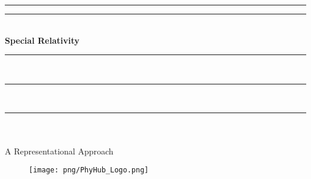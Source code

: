 \rule{\textwidth}{0pt}
\rule{\textwidth}{1pt} 
{ \Huge \bf {} \\ \vspace{0.3cm} \hspace*{\fill} Special Relativity \hspace*{\fill}}\\
\rule{\textwidth}{0pt}
\vspace{-1cm}\\
\rule{\textwidth}{1pt}
\vspace{-1.05cm}\\
\rule{\textwidth}{2pt}
\\
{ \\ \Huge \centering \hspace*{\fill} A Representational Approach \hspace*{\fill} }
\\
\vspace*{5cm}
\begin{figure}[ht]%
\centering
       \texttt{[image: png/PhyHub\_Logo.png]}
\end{figure}

\thispagestyle{empty}
\pagecolor{yellow}
\newpage